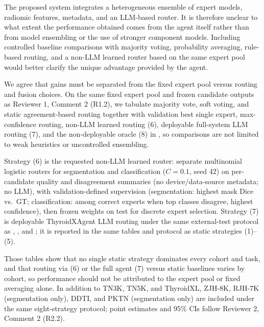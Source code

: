 \begin{reviewercomment}
The proposed system integrates a heterogeneous ensemble of expert models, radiomic features, metadata, and an LLM-based router. It is therefore unclear to what extent the performance obtained comes from the agent itself rather than from model ensembling or the use of stronger component models. Including controlled baseline comparisons with majority voting, probability averaging, rule-based routing, and a non-LLM learned router based on the same expert pool would better clarify the unique advantage provided by the agent.
\end{reviewercomment}
\begin{authorresponse}
We agree that gains must be separated from the fixed expert pool versus routing and fusion choices. On the same fixed expert pool and frozen candidate outputs as Reviewer 1, Comment 2 (R1.2), we tabulate majority vote, soft voting, and static agreement-based routing together with validation best single expert, max-confidence routing, non-LLM learned routing (6), deployable full-system LLM routing (7), and the non-deployable oracle (8) in , so comparisons are not limited to weak heuristics or uncontrolled ensembling.\par
Strategy (6) is the requested non-LLM learned router: separate multinomial logistic routers for segmentation and classification ($C{=}0.1$, seed 42) on per-candidate quality and disagreement summaries (no device/data-source metadata; no LLM), with validation-defined supervision (segmentation: highest mask Dice vs.\ GT; classification: among correct experts when top classes disagree, highest confidence), then frozen weights on test for discrete expert selection. Strategy (7) is deployable ThyroidXAgent LLM routing under the same external-test protocol as , , and ; it is reported in the same tables and protocol as static strategies (1)--(5).\par
Those tables show that no single static strategy dominates every cohort and task, and that routing via (6) or the full agent (7) versus static baselines varies by cohort, so performance should not be attributed to the expert pool or fixed averaging alone. In addition to TN3K, TN5K, and ThyroidXL, ZJH-8K, RJH-7K (segmentation only), DDTI, and PKTN (segmentation only) are included under the same eight-strategy protocol; point estimates and 95\% CIs follow Reviewer 2, Comment 2 (R2.2).\par
\par
\end{authorresponse}

